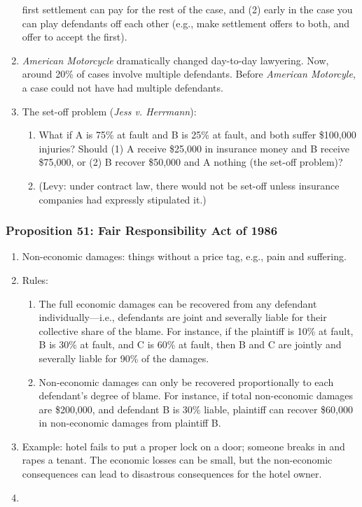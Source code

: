 \begin{enumerate}
    first settlement can pay for the rest of the case, and (2) early in the 
    case you can play defendants off each other (e.g., make settlement offers 
    to both, and offer to accept the first).
    \item \emph{American Motorcycle} dramatically changed day-to-day 
    lawyering. Now, around 20\% of cases involve multiple defendants. Before 
    \emph{American Motorcyle}, a case could not have had multiple defendants.
    \item The set-off problem (\emph{Jess v. Herrmann}):
    \begin{enumerate}
        \item What if A is 75\% at fault and B is 25\% at fault, and both 
        suffer \$100,000 injuries? Should (1) A receive \$25,000 in insurance 
        money and B receive \$75,000, or (2) B recover \$50,000 and A nothing 
        (the set-off problem)?
        \item (Levy: under contract law, there would not be set-off unless 
        insurance companies had expressly stipulated it.)
    \end{enumerate}
\end{enumerate}

\subsubsection{Proposition 51: Fair Responsibility Act of 1986}

\begin{enumerate}
    \item Non-economic damages: things without a price tag, e.g., pain and 
    suffering.
    \item Rules:
    \begin{enumerate}
        \item The full economic damages can be recovered from any defendant 
        individually---i.e., defendants are joint and severally liable for 
        their collective share of the blame. For instance, if the plaintiff is 
        10\% at fault, B is 30\% at fault, and C is 60\% at fault, then B and 
        C are jointly and severally liable for 90\% of the damages.
        \item Non-economic damages can only be recovered proportionally to 
        each defendant's degree of blame. For instance, if total non-economic 
        damages are \$200,000, and defendant B is 30\% liable, plaintiff can 
        recover \$60,000 in non-economic damages from plaintiff B.
    \end{enumerate}
    \item Example: hotel fails to put a proper lock on a door; someone breaks 
    in and rapes a tenant. The economic losses can be small, but the 
    non-economic consequences can lead to disastrous consequences for the 
    hotel owner.
    \item \end{enumerate}


